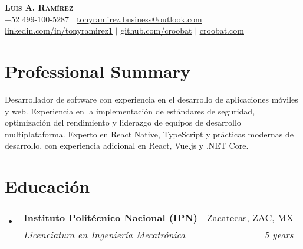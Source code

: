 \documentclass[letterpaper,11pt]{article}
\makeatletter
\newcommand{\resumeSubheading}[4]{
  \vspace{4pt}\item
    \begin{tabular*}{0.97\textwidth}[t]{l@{\extracolsep{\fill}}r}
      \textbf{#1} & #2 \\
      \textit{\small#3} & \textit{\small #4} \\
    \end{tabular*}\vspace{-2pt}
}
\newcommand{\resumeSubHeadingListStart}{\begin{itemize}[leftmargin=0.15in, label={}]}
\newcommand{\resumeSubHeadingListEnd}{\end{itemize}}
\makeatother
\begin{document}
\begin{center}
    \textbf{\Huge \scshape Luis A. Ramírez} \\ \vspace{1pt}
    \small +52 499-100-5287 $|$ \href{tonyramirez.business@outlook.com}{\underline{tonyramirez.business@outlook.com}} $|$
    \href{https://linkedin.com/in/tonyramirez1}{\underline{linkedin.com/in/tonyramirez1}} $|$
    \href{https://github.com/croobat}{\underline{github.com/croobat}} $|$
		\href{https://croobat.com}{\underline{croobat.com}}
\end{center}

\section{Professional Summary}
\begin{itemize}[leftmargin=0.15in, label={}]
\small{
\item{Desarrollador de software con experiencia en el desarrollo de aplicaciones móviles y web. Experiencia en la implementación de estándares de seguridad, optimización del rendimiento y liderazgo de equipos de desarrollo multiplataforma. Experto en React Native, TypeScript y prácticas modernas de desarrollo, con experiencia adicional en React, Vue.js y .NET Core.}
}
\end{itemize}

\section{Educación}
  \resumeSubHeadingListStart
    \resumeSubheading
      {Instituto Politécnico Nacional (IPN)}{Zacatecas, ZAC, MX}
      {Licenciatura en Ingeniería Mecatrónica}{5 years}
  \resumeSubHeadingListEnd

\end{document}
